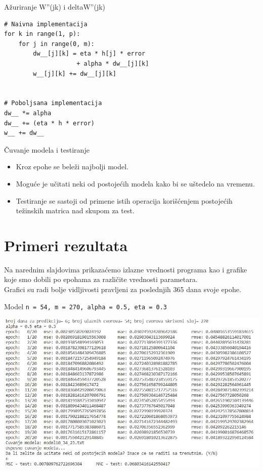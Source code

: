 \documentclass{beamer}
\begin{document}
\begin{frame}[fragile]{Ažuriranje W''(jk) i deltaW''(jk)}
    \begin{verbatim}
# Naivna implementacija
for k in range(1, p):
    for j in range(0, m):
        dw__[j][k] = eta * h[j] * error 
                    + alpha * dw__[j][k]
        w__[j][k] += dw__[j][k]
        

# Poboljsana implementacija
dw__ *= alpha
dw__ += (eta * h * error)
w__ += dw__
    \end{verbatim}
\end{frame}

\begin{frame}{Čuvanje modela i testiranje}
    \begin{itemize}
        \item Kroz epohe se beleži najbolji model.
        \item Moguće je učitati neki od postojećih modela kako bi se uštedelo na vremenu.
        \item Testiranje se sastoji od primene istih operacija korišćenjem postojećih težinskih matrica nad skupom za test.
    \end{itemize}
\end{frame}


\section{Primeri rezultata}
\begin{frame}[noframenumbering]
    Na narednim slajdovima prikazaćemo izlazne vrednosti programa kao i grafike koje smo dobili po epohama za različite vrednosti parametara.
    \\
    Grafici su radi bolje vidljivosti pravljeni za poslednjih 365 dana svoje epohe.
\end{frame}
\begin{frame}{\small{Model \texttt{n = 54, m = 270, alpha = 0.5, eta = 0.3}}}
    \begin{center}
    \includegraphics[scale=0.55]{output/output_example_program_10_34_23.JPG}
    \end{center}
\end{frame}
\end{document}

